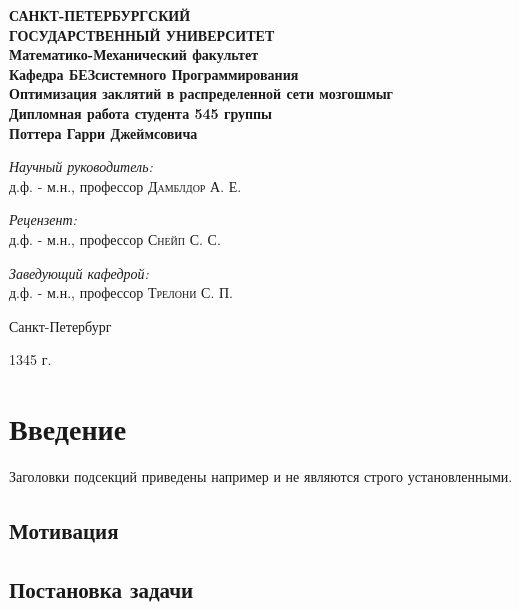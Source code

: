 \documentclass[aps,%
12pt,%
final,%
oneside,
onecolumn,%
musixtex, %
superscriptaddress,%
centertags]{article} %
\begin{document}
\begin{titlepage} 
\begin{center}
\textbf{\Large САНКТ-ПЕТЕРБУРГСКИЙ \\ ГОСУДАРСТВЕННЫЙ УНИВЕРСИТЕТ} \\[1.0cm]
\textbf{\large Математико-Механический факультет} \\[0.2cm]
\textbf{\large Кафедра БЕЗсистемного Программирования}\\[3.5cm]
 
\textbf{\LARGE Оптимизация заклятий в распределенной сети мозгошмыг}\\[1.0cm]
\textbf{\Large Дипломная работа студента 545 группы} \\[0.2cm]
\textbf{\Large Поттера Гарри Джеймсовича} \\[3.5cm]

\begin{flushright} \large
\emph{Научный руководитель:} \\
д.ф. - м.н., профессор \textsc{Дамблдор А. Е.}
\end{flushright}
 \begin{flushright} \large
\emph{Рецензент:} \\
д.ф. - м.н., профессор \textsc{Снейп С. С.}
\end{flushright}
\begin{flushright} \large
\emph{Заведующий кафедрой:} \\
д.ф. - м.н., профессор \textsc{Трелони С. П.}
\end{flushright}
\vfill 

{\large {Санкт-Петербург}} \par
{\large {1345 г.}}
\end{center} 
\end{titlepage}

\tableofcontents

\section{Введение}
Заголовки подсекций приведены например и не являются строго установленными.
\subsection{Мотивация} 
\subsection{Постановка задачи} 
\end{document}
